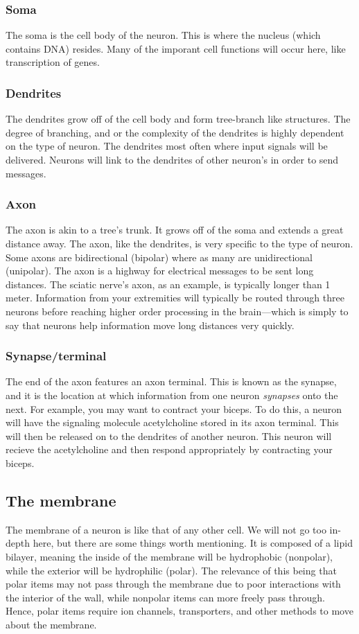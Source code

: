 \documentclass[12pt]{amsart}
\begin{document}
\subsubsection{Soma} The soma is the cell body of the neuron. This is where the nucleus (which contains DNA) resides. Many of the imporant cell functions will occur here, like transcription of genes. 

\subsubsection{Dendrites} The dendrites grow off of the cell body and form tree-branch like structures. The degree of branching, and or the complexity of the dendrites is highly dependent on the type of neuron. The dendrites most often where input signals will be delivered. Neurons will link to the dendrites of other neuron's in order to send messages. 

\subsubsection{Axon} The axon is akin to a tree's trunk. It grows off of the soma and extends a great distance away. The axon, like the dendrites, is very specific to the type of neuron. Some axons are bidirectional (bipolar) where as many are unidirectional (unipolar). The axon is a highway for electrical messages to be sent long distances. The sciatic nerve's axon, as an example, is typically longer than 1 meter. Information from your extremities will typically be routed through three neurons before reaching higher order processing in the brain---which is simply to say that neurons help information move long distances very quickly. 

\subsubsection{Synapse/terminal} The end of the axon features an axon terminal. This is known as the synapse, and it is the location at which information from one neuron \textit{synapses} onto the next. For example, you may want to contract your biceps. To do this, a neuron will have the signaling molecule acetylcholine stored in its axon terminal. This will then be released on to the dendrites of another neuron. This neuron will recieve the acetylcholine and then respond appropriately by contracting your biceps. 


\subsection{The membrane} The membrane of a neuron is like that of any other cell. We will not go too in-depth here, but there are some things worth mentioning. It is composed of a lipid bilayer, meaning the inside of the membrane will be hydrophobic (nonpolar), while the exterior will be hydrophilic (polar). The relevance of this being that polar items may not pass through the membrane due to poor interactions with the interior of the wall, while nonpolar items can more freely pass through. Hence, polar items require ion channels, transporters, and other methods to move about the membrane. \newline
\end{document}
